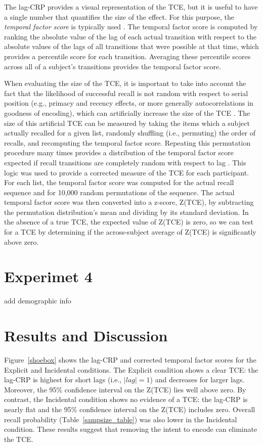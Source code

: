 \documentclass[man,natbib,floatsintext]{apa6} %
\begin{document}
The lag-CRP provides a visual representation of the TCE, but it is useful to have a single number that quantifies the size of the effect. For this purpose, the \emph{temporal factor score} is typically used \citep{SedeEtal10,PolyEtal09}. The temporal factor score is computed by ranking the absolute value of the lag of each actual transition with respect to the absolute values of the lags of all transitions that were possible at that time, which provides a percentile score for each transition. Averaging these percentile scores across all of a subject's transitions provides the temporal factor score.
 
When evaluating the size of the TCE, it is important to take into account the fact that the likelihood of successful recall is not random with respect to serial position (e.g., primacy and recency effects, or more generally autocorrelations in goodness of encoding), which can artificially increase the size of the TCE \citep{HealKaha17,Hint16}. The size of this artificial TCE can be measured by taking the items which a subject actually recalled for a given list, randomly shuffling (i.e., permuting) the order of recalls, and recomputing the temporal factor score. Repeating this permutation procedure many times provides a distribution of the temporal factor score expected if recall transitions are completely random with respect to lag \citep{HealKaha17}. This logic was used to provide a corrected measure of the TCE for each participant. For each list, the temporal factor score was computed for the actual recall sequence and for 10,000 random permutations of the sequence. The actual temporal factor score was then converted into a z-score, Z(TCE), by subtracting the permutation distribution's mean and dividing by its standard deviation. In the absence of a true TCE, the expected value of Z(TCE) is zero, so we can test for a TCE by determining if the across-subject average of Z(TCE) is significantly above zero.   

\section{Experimet 4}
\label{TODO-8} add demographic info


\section{Results and Discussion}

Figure~\ref{shoebox} shows the lag-CRP and corrected temporal factor scores for the Explicit and Incidental conditions. The Explicit condition shows a clear TCE: the lag-CRP is highest for short lags (i.e., $|lag|=1$) and decreases for larger lags. Moreover, the 95\% confidence interval on the Z(TCE) lies well above zero. By contrast, the Incidental condition shows no evidence of a TCE: the lag-CRP is nearly flat and the 95\% confidence interval on the Z(TCE) includes zero. Overall recall probability (Table~\ref{sampsize_table}) was also lower in the Incidental condition. These results suggest that removing the intent to encode can eliminate the TCE.
\end{document}
